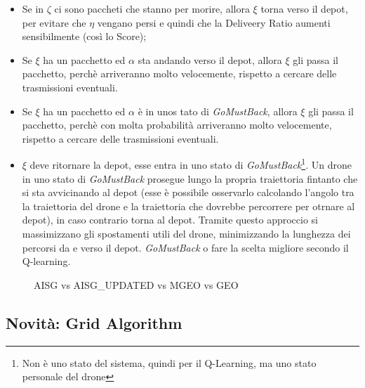 \documentclass[12pt]{article}
\begin{document}
\begin{itemize}

    \item Se in $\zeta$ ci sono paccheti che stanno per morire, allora $\xi$ torna verso il depot, per evitare che $\eta$ vengano persi e quindi che la Deliveery Ratio aumenti sensibilmente (così lo Score);

    \item Se $\xi$ ha un pacchetto ed $\alpha$ sta andando verso il depot, allora $\xi$ gli passa il pacchetto, perchè arriveranno molto velocemente, rispetto a cercare delle trasmissioni eventuali.
    
    \item  Se $\xi$ ha un pacchetto ed $\alpha$ è in unos tato di \textit{GoMustBack}, allora $\xi$ gli passa il pacchetto, perchè con molta probabilità arriveranno molto velocemente, rispetto a cercare delle trasmissioni eventuali.
    
    \item $\xi$ deve ritornare la depot, esse entra in uno stato di \textit{GoMustBack}\footnote{Non è uno stato del sistema, quindi per il Q-Learning, ma uno stato personale del drone}.
    Un drone in uno stato di \textit{GoMustBack} prosegue lungo la propria traiettoria fintanto che si sta avvicinando al depot (esse è possibile osservarlo calcolando l'angolo tra la traiettoria del drone e la traiettoria che dovrebbe percorrere per otrnare al depot), in caso contrario torna al depot. Tramite questo approccio si massimizzano gli spostamenti utili del drone, minimizzando la lunghezza dei percorsi da e verso il depot.
 \textit{GoMustBack} o fare la scelta migliore secondo il Q-learning.
    
\end{itemize}

\begin{figure}[H]
    
    \qquad
    \caption{AISG vs AISG\_UPDATED vs MGEO vs GEO}%
    \label{fig:example}%
\end{figure}


\subsection{Novità: Grid Algorithm}
\end{document}
